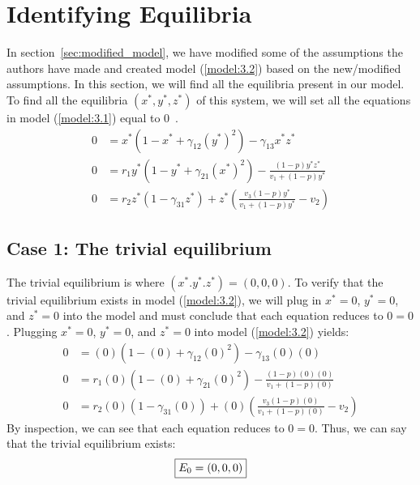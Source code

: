 \section{Identifying Equilibria}\label{sec:identify_equilibria}
In section~\ref{sec:modified_model}, we have modified some of the assumptions the authors have made and created model (\ref{model:3.2}) based on the new/modified assumptions. In this section, we will find all the equilibria present in our model. To find all the equilibria $\left(x^*,y^*,z^*\right)$ of this system, we will set all the equations in model (\ref{model:3.1}) equal to 0~\cite{book:2478639}.
\begin{subequations}
    \begin{align}
        0 &= x^*\left(1-x^*+\gamma_{12}\left(y^*\right)^2\right)-\gamma_{13}x^*z^*
        \label{eq:4.1a}\\
        0 &= r_1y^*\left(1-y^*+\gamma_{21}\left(x^*\right)^2\right)-\frac{\left(1-p\right)y^*z^*}{v_1+\left(1-p\right)y^*}
        \label{eq:4.1b}\\
        0 &= r_2z^*\left(1-\gamma_{31}z^*\right)+z^*\left(\frac{v_3\left(1-p\right)y^*}{v_1+\left(1-p\right)y^*}-v_2\right)
        \label{eq:4.1c}
    \end{align}
    \label{eq:4.1}
\end{subequations}

\subsection{Case 1: The trivial equilibrium}\label{subsec:trivial_equilibrium}
The trivial equilibrium is where $\left(x^*.y^*.z^*\right)=(0,0,0)$. To verify that the trivial equilibrium exists in model (\ref{model:3.2}), we will plug in $x^*=0$, $y^*=0$, and $z^*=0$ into the model and must conclude that each equation reduces to $0=0$. Plugging $x^*=0$, $y^*=0$, and $z^*=0$ into model (\ref{model:3.2}) yields:
\begin{align*}
    0 &= (0)\left(1-(0)+\gamma_{12}(0)^2\right)-\gamma_{13}(0)(0)\\
    0 &= r_1(0)\left(1-(0)+\gamma_{21}(0)^2\right)-\frac{\left(1-p\right)(0)(0)}{v_1+\left(1-p\right)(0)}\\
    0 &= r_2(0)\left(1-\gamma_{31}(0)\right)+(0)\left(\frac{v_3\left(1-p\right)(0)}{v_1+\left(1-p\right)(0)}-v_2\right)
\end{align*}
By inspection, we can see that each equation reduces to $0=0$. Thus, we can say that the trivial equilibrium exists:
\[
\fbox{$\displaystyle E_0=\left(0,0,0\right)$}
\]

